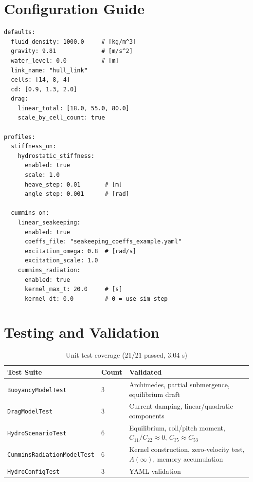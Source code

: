 \documentclass[12pt,a4paper]{article}
\begin{document}
\section{Configuration Guide}

\begin{lstlisting}
defaults:
  fluid_density: 1000.0     # [kg/m^3]
  gravity: 9.81             # [m/s^2]
  water_level: 0.0          # [m]
  link_name: "hull_link"
  cells: [14, 8, 4]
  cd: [0.9, 1.3, 2.0]
  drag:
    linear_total: [18.0, 55.0, 80.0]
    scale_by_cell_count: true

profiles:
  stiffness_on:
    hydrostatic_stiffness:
      enabled: true
      scale: 1.0
      heave_step: 0.01       # [m]
      angle_step: 0.001      # [rad]

  cummins_on:
    linear_seakeeping:
      enabled: true
      coeffs_file: "seakeeping_coeffs_example.yaml"
      excitation_omega: 0.8  # [rad/s]
      excitation_scale: 1.0
    cummins_radiation:
      enabled: true
      kernel_max_t: 20.0     # [s]
      kernel_dt: 0.0         # 0 = use sim step
\end{lstlisting}

\section{Testing and Validation}

\begin{table}[H]
  \centering
  \caption{Unit test coverage (21/21 passed, 3.04 s)}
  \begin{tabularx}{\linewidth}{llX}
    \toprule
    \textbf{Test Suite} & \textbf{Count} & \textbf{Validated} \\
    \midrule
    \texttt{BuoyancyModelTest}         & 3 & Archimedes, partial submergence, equilibrium draft \\
    \texttt{DragModelTest}             & 3 & Current damping, linear/quadratic components \\
    \texttt{HydroScenarioTest}         & 6 & Equilibrium, roll/pitch moment, $C_{11}/C_{22}\approx0$, $C_{35}\approx C_{53}$ \\
    \texttt{CumminsRadiationModelTest} & 6 & Kernel construction, zero-velocity test, $A(\infty)$, memory accumulation \\
    \texttt{HydroConfigTest}           & 3 & YAML validation \\
    \bottomrule
  \end{tabularx}
\end{table}
\end{document}
